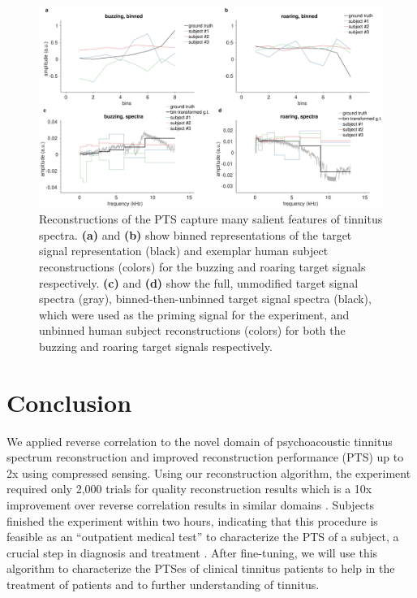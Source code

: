 \documentclass[journal]{IEEEtran}
\begin{document}
\begin{figure}[ht]
    \centering
    \includegraphics[width=\linewidth]{reconstructions.eps}
    \caption{Reconstructions of the PTS capture many salient features
    of tinnitus spectra.
    \textbf{(a)} and \textbf{(b)} show binned representations
    of the target signal representation (black) and exemplar
    human subject reconstructions (colors) for the buzzing and roaring
    target signals respectively.
    \textbf{(c)} and \textbf{(d)} show the full, unmodified target signal spectra
    (gray), binned-then-unbinned target signal spectra (black), which were used
    as the priming signal for the experiment,
    and unbinned human subject reconstructions (colors) for both the buzzing
    and roaring target signals respectively.}
    \label{fig:spectra}
\end{figure}

\section{Conclusion}

We applied reverse correlation to the novel domain of psychoacoustic tinnitus spectrum reconstruction
and improved reconstruction performance (PTS) up to 2x using compressed sensing.
Using our reconstruction algorithm, the experiment required only 2,000 trials
for quality reconstruction results which is a 10x improvement over reverse correlation results in similar domains
\cite{gosselinSuperstitiousPerceptionsReveal2003}.
Subjects finished the experiment within two hours,
indicating that this procedure is feasible as an ``outpatient medical test''
to characterize the PTS of a subject,
a crucial step in diagnosis and treatment \cite{henryTinnitusEpidemiologicPerspective2020,henryMeasurementTinnitus2016,norenaPsychoacousticCharacterizationTinnitus2002}.
After fine-tuning, we will use this algorithm
to characterize the PTSes of clinical tinnitus patients
to help in the treatment of patients and to further understanding of tinnitus.
\end{document}
